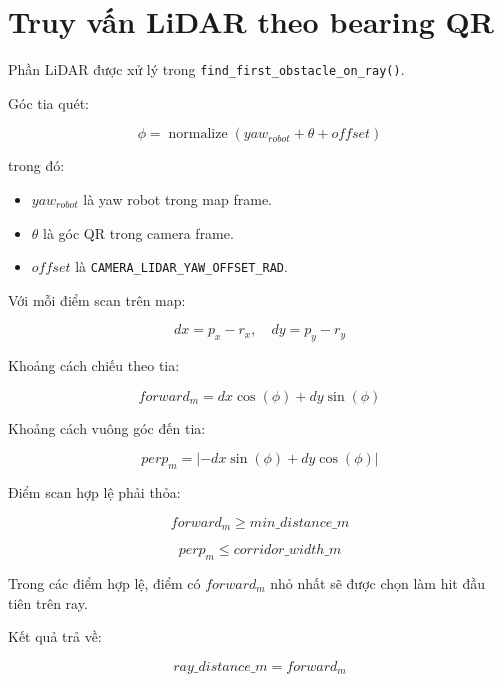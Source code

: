 \documentclass[12pt,a4paper]{article}
\begin{document}
\section{Truy vấn LiDAR theo bearing QR}

Phần LiDAR được xử lý trong \texttt{find\_first\_obstacle\_on\_ray()}.

Góc tia quét:

\begin{equation}
\phi = \operatorname{normalize}(yaw_{robot} + \theta + offset)
\end{equation}

trong đó:

\begin{itemize}
    \item $yaw_{robot}$ là yaw robot trong map frame.
    \item $\theta$ là góc QR trong camera frame.
    \item $offset$ là \texttt{CAMERA\_LIDAR\_YAW\_OFFSET\_RAD}.
\end{itemize}

Với mỗi điểm scan trên map:

\begin{equation}
dx = p_x - r_x,\quad dy = p_y - r_y
\end{equation}

Khoảng cách chiếu theo tia:

\begin{equation}
forward_m = dx \cos(\phi) + dy \sin(\phi)
\end{equation}

Khoảng cách vuông góc đến tia:

\begin{equation}
perp_m = | -dx \sin(\phi) + dy \cos(\phi) |
\end{equation}

Điểm scan hợp lệ phải thỏa:

\begin{equation}
forward_m \ge min\_distance\_m
\end{equation}

\begin{equation}
perp_m \le corridor\_width\_m
\end{equation}

Trong các điểm hợp lệ, điểm có $forward_m$ nhỏ nhất sẽ được chọn làm hit đầu tiên trên ray.

Kết quả trả về:

\begin{equation}
ray\_distance\_m = forward_m
\end{equation}
\end{document}
